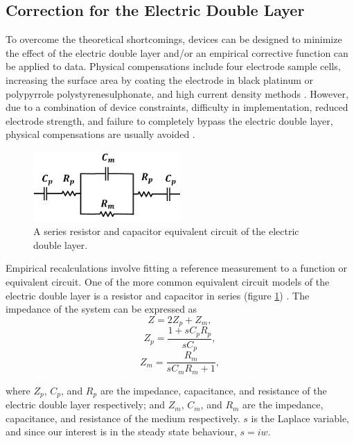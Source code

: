 \subsection{Correction for the Electric Double Layer}

\par To overcome the theoretical shortcomings, devices can be designed to minimize the effect of the electric double layer and/or an empirical corrective function can be applied to data. Physical compensations include four electrode sample cells, increasing the surface area by coating the electrode in black platinum or polypyrrole polystyrenesulphonate, and high current density methods \cite{ishai_electrode_2013}. However, due to a combination of device constraints, difficulty in implementation, reduced electrode strength, and failure to completely bypass the electric double layer, physical compensations are usually avoided \cite{ishai_assessment_2012}. 

\begin{figure}
    \centering
    \includegraphics[width=0.5\textwidth]{images/edl_cap_equiv.png}
    \caption{A series resistor and capacitor equivalent circuit of the electric double layer.}
    \label{fig:edl_cap_equiv}
\end{figure}

\par Empirical recalculations involve fitting a reference measurement to a function or equivalent circuit. One of the more common equivalent circuit models of the electric double layer is a resistor and capacitor in series (figure \ref{fig:edl_cap_equiv}) \cite{feldman_fractal-polarization_1998}. The impedance of the system can be expressed as
\begin{equation}
    Z = 2Z_p + Z_m,
\end{equation}
\begin{equation}
    Z_p = \frac{1 + sC_pR_p}{sC_p},
\end{equation}
\begin{equation}
    Z_m = \frac{R_m}{sC_mR_m+1},
\end{equation}

\noindent where $Z_p$, $C_p$, and $R_p$ are the impedance, capacitance, and resistance of the electric double layer respectively; and $Z_m$, $C_m$, and $R_m$ are the impedance, capacitance, and resistance of the medium respectively. $s$ is the Laplace variable, and since our interest is in the steady state behaviour, $s = iw$.

